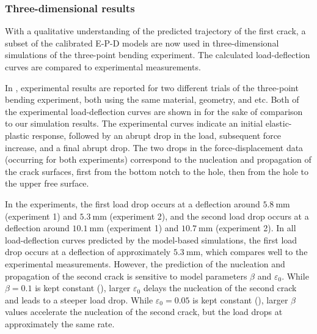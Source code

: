 \subsubsection{Three-dimensional results}
\label{section: Chapter5/examples/3pb/3D}

With a qualitative understanding of the predicted trajectory of the first crack, a subset of the calibrated E-P-D models are now used in three-dimensional simulations of the three-point bending experiment.   The calculated load-deflection curves are compared to experimental measurements.



In \cite{kubik2019ductile}, experimental results are reported for two different trials of the three-point bending experiment, both using the same material, geometry, and etc.  Both of the experimental load-deflection curves are shown in  for the sake of comparison to our simulation results. The experimental curves indicate an initial elastic-plastic response, followed by an abrupt drop in the load, subsequent force increase, and a final abrupt drop.  The two drops in the force-displacement data (occurring for both experiments) correspond to the nucleation and propagation of the crack surfaces, first from the bottom notch to the hole, then from the hole to the upper free surface.

In the experiments, the first load drop occurs at a deflection around $\SI{5.8}{\milli\meter}$ (experiment 1) and $\SI{5.3}{\milli\meter}$ (experiment 2), and the second load drop occurs at a deflection around $\SI{10.1}{\milli\meter}$ (experiment 1) and $\SI{10.7}{\milli\meter}$ (experiment 2).
In all load-deflection curves predicted by the model-based simulations, the first load drop occurs at a deflection of approximately  $\SI{5.3}{\milli\meter}$, which compares well to the experimental measurements.
However, the prediction of the nucleation and propagation of the second crack is sensitive to model parameters $\beta$ and $\varepsilon_0$. While $\beta = 0.1$ is kept constant (), larger $\varepsilon_0$ delays the nucleation of the second crack and leads to a steeper load drop.  While $\varepsilon_0 = 0.05$ is kept constant (), larger $\beta$ values accelerate the nucleation of the second crack, but the load drops at approximately the same rate.

